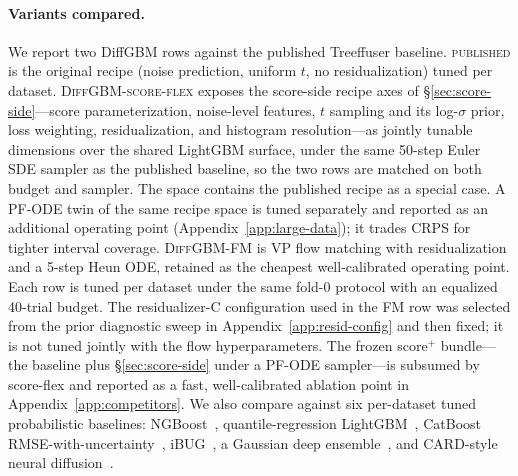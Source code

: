 \documentclass{article}
\begin{document}
\paragraph{Variants compared.} We report two DiffGBM rows against the published Treeffuser baseline. \textsc{published} is the original recipe (noise prediction, uniform $t$, no residualization) tuned per dataset. \textsc{DiffGBM-score-flex} exposes the score-side recipe axes of \S\ref{sec:score-side}---score parameterization, noise-level features, $t$ sampling and its log-$\sigma$ prior, loss weighting, residualization, and histogram resolution---as jointly tunable dimensions over the shared LightGBM surface, under the same 50-step Euler SDE sampler as the published baseline, so the two rows are matched on both budget and sampler. The space contains the published recipe as a special case. A PF-ODE twin of the same recipe space is tuned separately and reported as an additional operating point (Appendix~\ref{app:large-data}); it trades CRPS for tighter interval coverage. \textsc{DiffGBM-FM} is VP flow matching with residualization and a 5-step Heun ODE, retained as the cheapest well-calibrated operating point. Each row is tuned per dataset under the same fold-0 protocol with an equalized 40-trial budget. The residualizer-C configuration used in the FM row was selected from the prior diagnostic sweep in Appendix~\ref{app:resid-config} and then fixed; it is not tuned jointly with the flow hyperparameters. The frozen score$^+$ bundle---the baseline plus \S\ref{sec:score-side} under a PF-ODE sampler---is subsumed by score-flex and reported as a fast, well-calibrated ablation point in Appendix~\ref{app:competitors}. We also compare against six per-dataset tuned probabilistic baselines: NGBoost~\citep{duan2020ngboost}, quantile-regression LightGBM~\citep{ke2017lightgbm}, CatBoost RMSE-with-uncertainty~\citep{prokhorenkova2018catboost}, iBUG~\citep{brophy2022ibug}, a Gaussian deep ensemble~\citep{lakshminarayanan2017deep}, and CARD-style neural diffusion~\citep{han2022card}.
\end{document}
